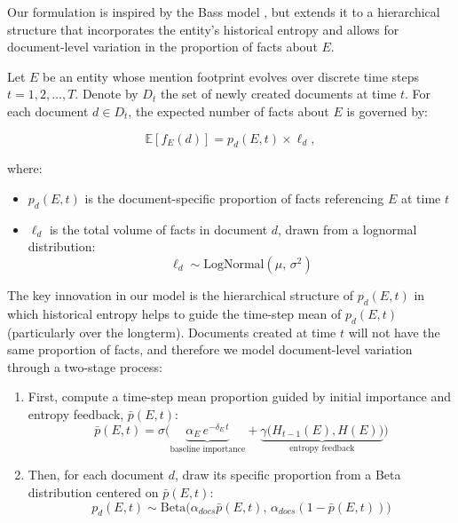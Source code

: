 \documentclass[11pt,a4paper]{article}
\begin{document}
Our formulation is inspired by the Bass model \cite{bass1969new}, but extends it to a hierarchical structure that incorporates the entity's historical entropy and allows for document-level variation in the proportion of facts about $E$.

Let $E$ be an entity whose mention footprint evolves over discrete time steps $t = 1, 2, \ldots, T$. Denote by $D_t$ the set of newly created documents at time $t$. For each document $d \in D_t$, the expected number of facts about $E$ is governed by:

\begin{equation}
    \mathbb{E}[f_E(d)] = p_d(E, t) \times \ell_d,
\end{equation}

where:
\begin{itemize}
    \item $p_d(E, t)$ is the document-specific proportion of facts referencing $E$ at time $t$
    \item $\ell_d$ is the total volume of facts in document $d$, drawn from a lognormal distribution:
    \begin{equation}
        \ell_d \sim \mathrm{LogNormal}(\mu,\,\sigma^2)
    \end{equation}
\end{itemize}

The key innovation in our model is the hierarchical structure of $p_d(E, t)$ in which historical entropy helps to guide the time-step mean of $p_d(E, t)$ (particularly over the longterm). Documents created at time $t$ will not have the same proportion of facts, and therefore we model document-level variation through a two-stage process:

\begin{enumerate}
    \item First, compute a time-step mean proportion guided by initial importance and entropy feedback, $\bar{p}(E,t)$:
    \begin{equation}
    \label{eq:p_e_t}
        \bar{p}(E,t) = \sigma\!\Big(\underbrace{\alpha_E\,e^{-\delta_E\,t}}_{\text{baseline importance}}
        + \underbrace{\gamma\big(H_{t-1}(E), H(E)\big)}_{\text{entropy feedback}}\Big)
    \end{equation}

    \item Then, for each document $d$, draw its specific proportion from a Beta distribution centered on $\bar{p}(E,t)$:
    \begin{equation}
        p_d(E,t) \sim \text{Beta}\big(\alpha_{docs}\bar{p}(E,t),\, \alpha_{docs}(1-\bar{p}(E,t))\big)
    \end{equation}
\end{enumerate}
\end{document}
